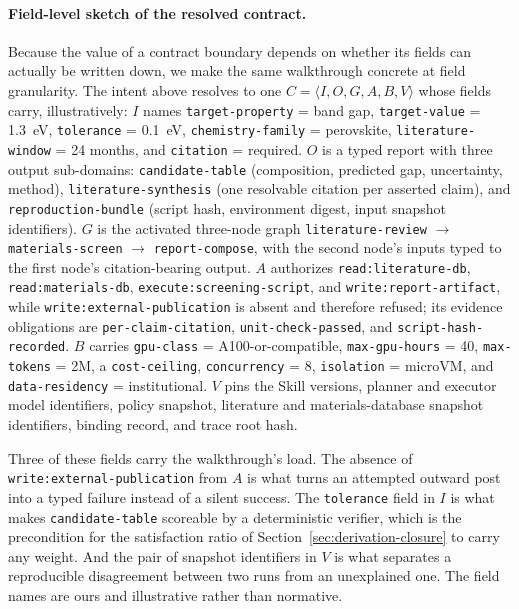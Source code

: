 \documentclass[11pt]{article}
\begin{document}
\paragraph{Field-level sketch of the resolved contract.}
Because the value of a contract boundary depends on whether its fields can actually be written down, we make the same walkthrough concrete at field granularity. The intent above resolves to one $C=\langle I,O,G,A,B,V\rangle$ whose fields carry, illustratively: $I$ names \texttt{target-property} = band gap, \texttt{target-value} = 1.3~eV, \texttt{tolerance} = 0.1~eV, \texttt{chemistry-family} = perovskite, \texttt{literature-window} = 24 months, and \texttt{citation} = required. $O$ is a typed report with three output sub-domains: \texttt{candidate-table} (composition, predicted gap, uncertainty, method), \texttt{literature-synthesis} (one resolvable citation per asserted claim), and \texttt{reproduction-bundle} (script hash, environment digest, input snapshot identifiers). $G$ is the activated three-node graph \texttt{literature-review} $\rightarrow$ \texttt{materials-screen} $\rightarrow$ \texttt{report-compose}, with the second node's inputs typed to the first node's citation-bearing output. $A$ authorizes \texttt{read:literature-db}, \texttt{read:materials-db}, \texttt{execute:screening-script}, and \texttt{write:report-artifact}, while \texttt{write:external-publication} is absent and therefore refused; its evidence obligations are \texttt{per-claim-citation}, \texttt{unit-check-passed}, and \texttt{script-hash-recorded}. $B$ carries \texttt{gpu-class} = A100-or-compatible, \texttt{max-gpu-hours} = 40, \texttt{max-tokens} = 2M, a \texttt{cost-ceiling}, \texttt{concurrency} = 8, \texttt{isolation} = microVM, and \texttt{data-residency} = institutional. $V$ pins the Skill versions, planner and executor model identifiers, policy snapshot, literature and materials-database snapshot identifiers, binding record, and trace root hash.

Three of these fields carry the walkthrough's load. The absence of \texttt{write:external-publication} from $A$ is what turns an attempted outward post into a typed failure instead of a silent success. The \texttt{tolerance} field in $I$ is what makes \texttt{candidate-table} scoreable by a deterministic verifier, which is the precondition for the satisfaction ratio of Section~\ref{sec:derivation-closure} to carry any weight. And the pair of snapshot identifiers in $V$ is what separates a reproducible disagreement between two runs from an unexplained one. The field names are ours and illustrative rather than normative.
\end{document}
